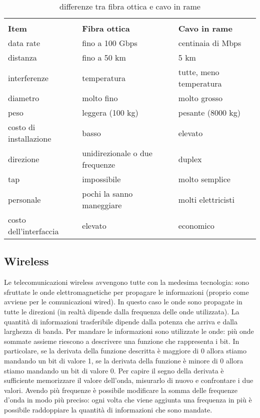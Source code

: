 \documentclass{article}
\begin{document}
\begin{table}[ht]
	\label{ottica_rame}
	\centering
	\begin{tabular}{|l|l|l|}
		\hline
		                       &                                &                         \\
		\textbf{Item}          & \textbf{Fibra ottica}          & \textbf{Cavo in rame}   \\
		\hline
		data rate              & fino a 100 Gbps                & centinaia di Mbps       \\
		distanza               & fino a 50 km                   & 5 km                    \\
		interferenze           & temperatura                    & tutte, meno temperatura \\
		diametro               & molto fino                     & molto grosso            \\
		peso                   & leggera (100 kg)               & pesante (8000 kg)       \\
		costo di installazione & basso                          & elevato                 \\
		direzione              & unidirezionale o due frequenze & duplex                  \\
		tap                    & impossibile                    & molto semplice          \\
		personale              & pochi la sanno maneggiare      & molti elettricisti      \\
		costo dell'interfaccia & elevato                        & economico               \\
		\hline
	\end{tabular}
	\caption{differenze tra fibra ottica e cavo in rame}
\end{table}

\subsection{Wireless}
Le telecomunicazioni wireless avvengono tutte con la medesima tecnologia: sono
sfruttate le onde elettromagnetiche per propagare le informazioni (proprio come
avviene per le comunicazioni wired). In questo caso le onde sono propagate in
tutte le direzioni (in realtà dipende dalla frequenza delle onde utilizzata).
La quantità di informazioni trasferibile dipende dalla
potenza che arriva e dalla larghezza di banda. Per mandare le informazioni sono
utilizzate le onde: più onde sommate assieme riescono a descrivere una funzione
che rappresenta i bit. In particolare, se la derivata della funzione descritta è
maggiore di 0 allora stiamo mandando un bit di valore 1, se la derivata della
funzione è minore di 0 allora stiamo mandando un bit di valore 0. Per capire il
segno della derivata è sufficiente memorizzare il valore dell'onda, misurarlo di
nuovo e confrontare i due valori. Avendo più frequenze è possibile modificare
la somma delle frequenze d'onda in modo più preciso: ogni volta che viene
aggiunta una frequenza in più è possibile raddoppiare la quantità di
informazioni che sono mandate.\\
\end{document}
